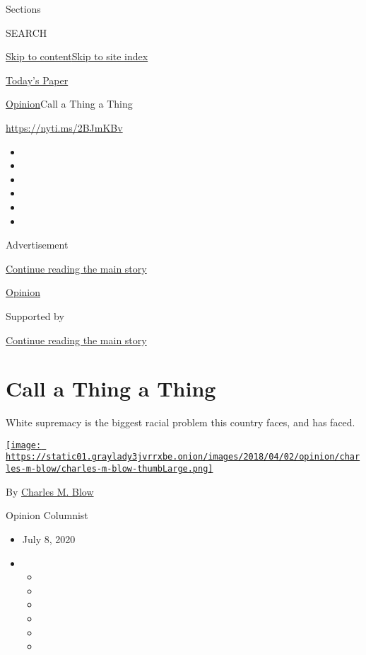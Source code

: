 Sections

SEARCH

\protect\hyperlink{site-content}{Skip to
content}\protect\hyperlink{site-index}{Skip to site index}

\href{https://myaccount.nytimes3xbfgragh.onion/auth/login?response_type=cookie\&client_id=vi}{}

\href{https://www.nytimes3xbfgragh.onion/section/todayspaper}{Today's
Paper}

\href{/section/opinion}{Opinion}\textbar{}Call a Thing a Thing

\url{https://nyti.ms/2BJmKBv}

\begin{itemize}
\item
\item
\item
\item
\item
\item
\end{itemize}

Advertisement

\protect\hyperlink{after-top}{Continue reading the main story}

\href{/section/opinion}{Opinion}

Supported by

\protect\hyperlink{after-sponsor}{Continue reading the main story}

\hypertarget{call-a-thing-a-thing}{%
\section{Call a Thing a Thing}\label{call-a-thing-a-thing}}

White supremacy is the biggest racial problem this country faces, and
has faced.

\href{https://www.nytimes3xbfgragh.onion/by/charles-m-blow}{\texttt{[image: https://static01.graylady3jvrrxbe.onion/images/2018/04/02/opinion/charles-m-blow/charles-m-blow-thumbLarge.png]}}

By \href{https://www.nytimes3xbfgragh.onion/by/charles-m-blow}{Charles
M. Blow}

Opinion Columnist

\begin{itemize}
\item
  July 8, 2020
\item
  \begin{itemize}
  \item
  \item
  \item
  \item
  \item
  \item
  \end{itemize}
\end{itemize}

